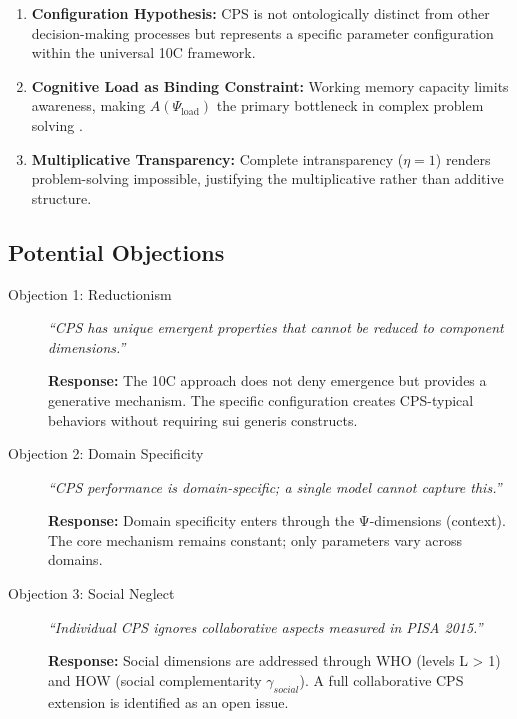 \begin{enumerate}
\item \textbf{Configuration Hypothesis:} CPS is not ontologically distinct from other decision-making processes but represents a specific parameter configuration within the universal 10C framework.

\item \textbf{Cognitive Load as Binding Constraint:} Working memory capacity limits awareness, making $A(\Psi_{\text{load}})$ the primary bottleneck in complex problem solving \citep{PAP-sweller1988cognitiveload}.

\item \textbf{Multiplicative Transparency:} Complete intransparency ($\eta = 1$) renders problem-solving impossible, justifying the multiplicative rather than additive structure.
\end{enumerate}

\subsection{Potential Objections}

\begin{description}
\item[Objection 1: Reductionism] \textit{``CPS has unique emergent properties that cannot be reduced to component dimensions.''}

\textbf{Response:} The 10C approach does not deny emergence but provides a generative mechanism. The specific configuration creates CPS-typical behaviors without requiring sui generis constructs.

\item[Objection 2: Domain Specificity] \textit{``CPS performance is domain-specific; a single model cannot capture this.''}

\textbf{Response:} Domain specificity enters through the Ψ-dimensions (context). The core mechanism remains constant; only parameters vary across domains.

\item[Objection 3: Social Neglect] \textit{``Individual CPS ignores collaborative aspects measured in PISA 2015.''}

\textbf{Response:} Social dimensions are addressed through WHO (levels L > 1) and HOW (social complementarity $\gamma_{social}$). A full collaborative CPS extension is identified as an open issue.
\end{description}



